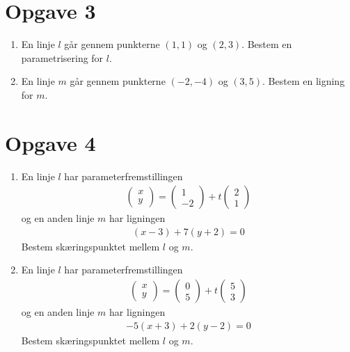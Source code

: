 \section*{Opgave 3}
\begin{enumerate}[label=\roman*)]
	\item En linje $l$ går gennem punkterne $(1,1)$ og $(2,3)$. Bestem en parametrisering for 
	$l$. 
	\item En linje $m$ går gennem punkterne $(-2,-4)$ og $(3,5)$. Bestem en ligning for $m$. 
\end{enumerate}

\section*{Opgave 4}
\begin{enumerate}[label=\roman*)]
	\item En linje $l$ har parameterfremstillingen 
	\begin{align*}
		\begin{pmatrix}
			x \\ y
		\end{pmatrix} = 
		\begin{pmatrix}
			1 \\ -2
		\end{pmatrix} + t
		\begin{pmatrix}
			2 \\ 1
		\end{pmatrix}
	\end{align*}
	og en anden linje $m$ har ligningen
	\begin{align*}
		(x-3) + 7(y+2) = 0
	\end{align*}
	Bestem skæringspunktet mellem $l$ og $m$. 
	\item En linje $l$ har parameterfremstillingen 
	\begin{align*}
		\begin{pmatrix}
			x \\ y
		\end{pmatrix} = 
		\begin{pmatrix}
			0 \\ 5
		\end{pmatrix} + t
		\begin{pmatrix}
			5 \\ 3
		\end{pmatrix}
	\end{align*}
	og en anden linje $m$ har ligningen
	\begin{align*}
		-5(x+3) + 2(y-2) = 0
	\end{align*}
	Bestem skæringspunktet mellem $l$ og $m$. 
\end{enumerate}
